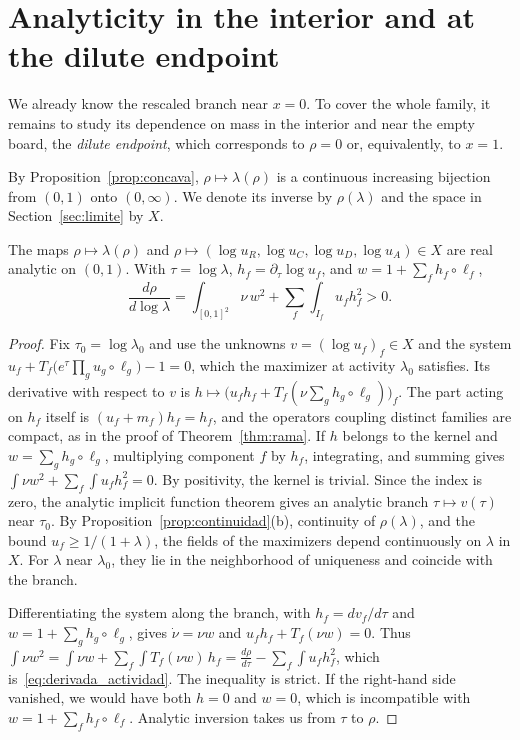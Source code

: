 \section{Analyticity in the interior and at the dilute endpoint}\label{sec:analiticidad}

We already know the rescaled branch near $x=0$. To cover the whole family, it remains to study its dependence on mass in the interior
and near the empty board, the \emph{dilute endpoint}, which corresponds to $\rho=0$ or, equivalently, to $x=1$.

By Proposition~\ref{prop:concava}, $\rho\mapsto\lambda(\rho)$ is a continuous increasing bijection from $(0,1)$ onto $(0,\infty)$. We
denote its inverse by $\rho(\lambda)$ and the space in Section~\ref{sec:limite} by $X$.

\begin{proposicion}[Interior]\label{prop:interior} The maps $\rho\mapsto\lambda(\rho)$ and $\rho\mapsto(\log u_R,\log u_C,\log u_D,\log
u_A)\in X$ are real analytic on $(0,1)$. With $\tau=\log\lambda$, $h_f=\partial_\tau\log u_f$, and $w=1+\sum_fh_f\circ\ell_f$,
\begin{equation}\label{eq:derivada_actividad}
 \frac{d\rho}{d\log\lambda}=\int_{[0,1]^2}\nu\,w^2+\sum_f\int_{I_f}u_fh_f^2>0 .
\end{equation} \end{proposicion}

\begin{proof} Fix $\tau_0=\log\lambda_0$ and use the unknowns $v=(\log u_f)_f\in X$ and the system
$u_f+T_f\bigl(e^\tau\prod_gu_g\circ\ell_g\bigr)-1=0$, which the maximizer at activity $\lambda_0$ satisfies. Its derivative with
respect to $v$ is $h\mapsto\bigl(u_fh_f+T_f(\nu\sum_gh_g\circ\ell_g)\bigr)_f$. The part acting on $h_f$ itself is $(u_f+m_f)h_f=h_f$, and the
operators coupling distinct families are compact, as in the proof of Theorem~\ref{thm:rama}. If $h$ belongs to the kernel and
$w=\sum_gh_g\circ\ell_g$, multiplying component $f$ by $h_f$, integrating, and summing gives $\int\nu w^2+\sum_f\int u_fh_f^2=0$. By
positivity, the kernel is trivial. Since the index is zero, the analytic implicit function theorem gives an analytic branch
$\tau\mapsto v(\tau)$ near $\tau_0$. By Proposition~\ref{prop:continuidad}(b), continuity of $\rho(\lambda)$, and the bound
$u_f\ge1/(1+\lambda)$, the fields of the maximizers depend continuously on $\lambda$ in $X$. For $\lambda$ near $\lambda_0$, they lie
in the neighborhood of uniqueness and coincide with the branch.

Differentiating the system along the branch, with $h_f=dv_f/d\tau$ and $w=1+\sum_gh_g\circ\ell_g$, gives $\dot\nu=\nu w$ and
$u_fh_f+T_f(\nu w)=0$. Thus $\int\nu w^2=\int\nu w+\sum_f\int T_f(\nu w)\,h_f=\frac{d\rho}{d\tau}-\sum_f\int u_fh_f^2$, which
is~\eqref{eq:derivada_actividad}. The inequality is strict. If the right-hand side vanished, we would have both $h=0$ and $w=0$, which
is incompatible with $w=1+\sum_fh_f\circ\ell_f$. Analytic inversion takes us from $\tau$ to $\rho$. \end{proof}

